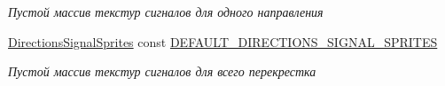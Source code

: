 \begin{Indent}
\begin{DoxyCompactItemize}
\begin{DoxyCompactList}\small\item\em Пустой массив текстур сигналов для одного направления \end{DoxyCompactList}\item 
\hyperlink{namespacertm_ac9f276c8ed33ee992eb1a1f04a8254a0}{Directions\+Signal\+Sprites} const \hyperlink{namespacertm_a88c10d12831a4c6e13e0babdf7c27b02}{D\+E\+F\+A\+U\+L\+T\+\_\+\+D\+I\+R\+E\+C\+T\+I\+O\+N\+S\+\_\+\+S\+I\+G\+N\+A\+L\+\_\+\+S\+P\+R\+I\+T\+ES}
\begin{DoxyCompactList}\small\item\em Пустой массив текстур сигналов для всего перекрестка \end{DoxyCompactList}\end{DoxyCompactItemize}
\end{Indent}
